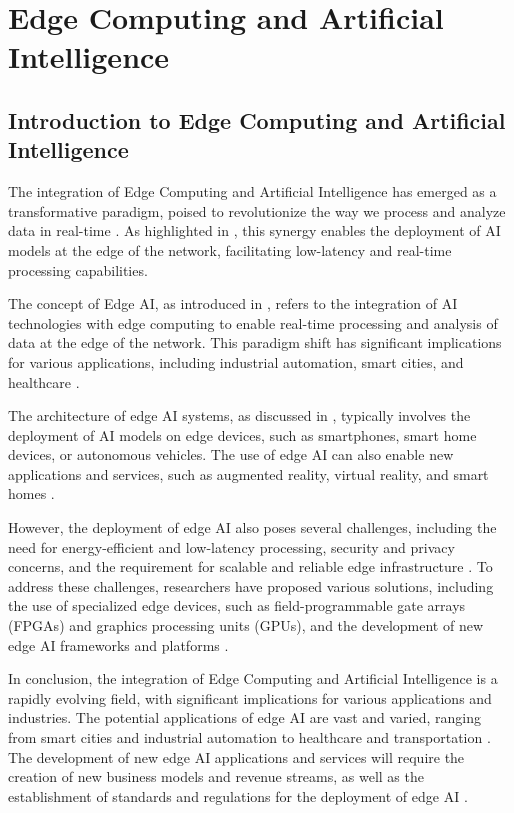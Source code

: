 \documentclass[11pt,a4paper]{article}
\begin{document}
\section{Edge Computing and Artificial Intelligence}



\subsection{Introduction to Edge Computing and Artificial Intelligence}


The integration of Edge Computing and Artificial Intelligence has emerged as a transformative paradigm, poised to revolutionize the way we process and analyze data in real-time \cite{arxiv:1909.00560}. As highlighted in \cite{arxiv:1905.10083}, this synergy enables the deployment of AI models at the edge of the network, facilitating low-latency and real-time processing capabilities. 

The concept of Edge AI, as introduced in \cite{arxiv:1905.10083}, refers to the integration of AI technologies with edge computing to enable real-time processing and analysis of data at the edge of the network. This paradigm shift has significant implications for various applications, including industrial automation, smart cities, and healthcare \cite{arxiv:2004.07311}. 

The architecture of edge AI systems, as discussed in \cite{arxiv:1702.06331}, typically involves the deployment of AI models on edge devices, such as smartphones, smart home devices, or autonomous vehicles. The use of edge AI can also enable new applications and services, such as augmented reality, virtual reality, and smart homes \cite{arxiv:2205.02764}. 

However, the deployment of edge AI also poses several challenges, including the need for energy-efficient and low-latency processing, security and privacy concerns, and the requirement for scalable and reliable edge infrastructure \cite{arxiv:2206.07164}. To address these challenges, researchers have proposed various solutions, including the use of specialized edge devices, such as field-programmable gate arrays (FPGAs) and graphics processing units (GPUs), and the development of new edge AI frameworks and platforms \cite{arxiv:1702.05309}. 

In conclusion, the integration of Edge Computing and Artificial Intelligence is a rapidly evolving field, with significant implications for various applications and industries. The potential applications of edge AI are vast and varied, ranging from smart cities and industrial automation to healthcare and transportation \cite{arxiv:2305.01974}. The development of new edge AI applications and services will require the creation of new business models and revenue streams, as well as the establishment of standards and regulations for the deployment of edge AI \cite{arxiv:2301.07803}. 
\end{document}
